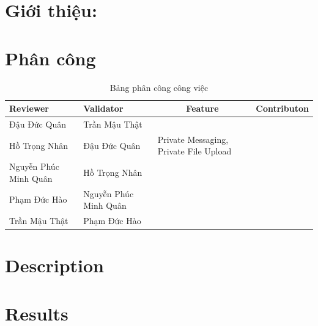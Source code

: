 \documentclass[a4paper, 12pt]{article}
\begin{document}
\newpage
\tableofcontents
\newpage
\section{Giới thiệu:}

\section{Phân công}
 \begin{table}[H]
\centering
\begin{tabular}{|p{3cm}|p{3cm}|l|c|}
\hline 
Reviewer &
Validator &
  \multicolumn{1}{c|}{Feature} &Contributon \\ \hline
Đậu Đức Quân & Trần Mậu Thật &&\\\hline
Hồ Trọng Nhân & Đậu Đức Quân &Private Messaging, Private File Upload&\\ \hline
Nguyễn Phúc Minh Quân & Hồ Trọng Nhân &&\\ \hline
Phạm Đức Hào & Nguyễn Phúc Minh Quân &&\\ \hline
Trần Mậu Thật & Phạm Đức Hào &&\\ \hline
\end{tabular}
\caption{Bảng phân công công việc}
\label{tab:my-table}
\end{table}

\newpage



\section{Description}










\section{Results}










\end{document}
